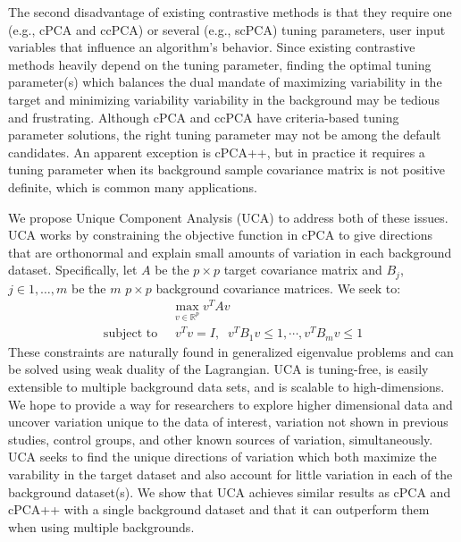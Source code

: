 \documentclass[12pt]{article}
\begin{document}
   The second disadvantage of existing contrastive methods is that they require one (e.g., cPCA and ccPCA) or several (e.g., scPCA) tuning parameters, user input variables that influence an algorithm's behavior. Since existing contrastive methods heavily depend on the tuning parameter, finding the optimal tuning parameter(s) which balances the dual mandate of maximizing variability in the target and minimizing variability variability in the background may be tedious and frustrating. Although cPCA and ccPCA have criteria-based tuning parameter solutions, the right tuning parameter may not be among the default candidates. An apparent exception is cPCA++, but in practice it requires a tuning parameter when its background sample covariance matrix is not positive definite, which is common many applications.
   
    
    
    We propose Unique Component Analysis (UCA) to address both of these issues. UCA works by constraining the objective function in cPCA to give directions that are orthonormal and explain small amounts of variation in each background dataset. Specifically, let $A$ be the $p \times p$ target covariance matrix and $B_j$, $j \in 1,\ldots, m$ be the $m$ $p\times p$ background covariance matrices. We seek to: 
     \begin{align}
         &\max_{v\in \mathbb{R}^p}{v^TAv} \nonumber\\ 
         \text{subject to }&\; v^{T}v=I,\;\; v^TB_1 v \leq 1, \cdots, v^T B_m v \leq 1 \nonumber
     \end{align}
    These constraints are naturally found in generalized eigenvalue problems and can be solved using weak duality of the Lagrangian.
    UCA is tuning-free, is easily extensible to multiple background data sets, and is scalable to high-dimensions. We hope to provide a way for researchers to explore higher dimensional data and uncover variation unique to the data of interest, variation not shown in previous studies, control groups, and other known sources of variation, simultaneously. UCA seeks to find the unique directions of variation which both maximize the varability in the target dataset and also account for little variation in each of the background dataset(s). We show that UCA achieves similar results as cPCA and cPCA++ with a single background dataset and that it can outperform them when using multiple backgrounds. 
\end{document}
